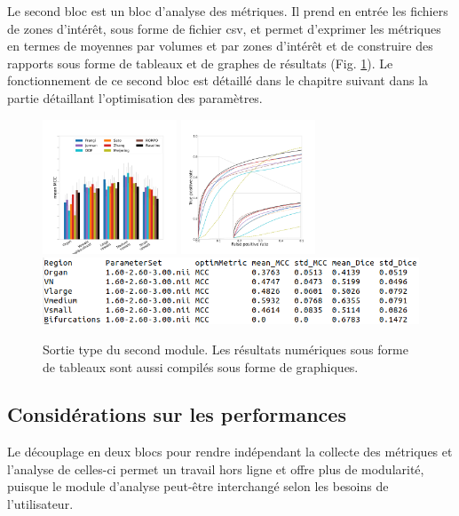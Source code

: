 Le second bloc est un bloc d'analyse des métriques. Il prend en entrée les fichiers de zones d'intérêt, sous forme de fichier csv, et permet d'exprimer les métriques en termes de moyennes par volumes et par zones d'intérêt et de construire des rapports sous forme de tableaux et de graphes de résultats (Fig. \ref{fig:bench_module2}). Le fonctionnement de ce second bloc est détaillé dans le chapitre suivant dans la partie détaillant l'optimisation des paramètres. 

\begin{figure}[!ht]
  \centering
  \includegraphics[height=4cm]{Images/bench_Ircad_PS_MCC.pdf}
  \includegraphics[height=4cm]{Images/bench_Ircad_ROC.pdf}
  \includegraphics[width=\textwidth]{Images/bench_type_of_results.png}
  \caption{Sortie type du second module. Les résultats numériques sous forme de tableaux sont aussi compilés sous forme de graphiques.}
  \label{fig:bench_module2}
\end{figure}

\subsection{Considérations sur les performances}

Le découplage en deux blocs pour rendre indépendant la collecte des métriques et l'analyse de celles-ci permet un travail hors ligne et offre plus de modularité, puisque le module d'analyse peut-être interchangé selon les besoins de l'utilisateur. 

